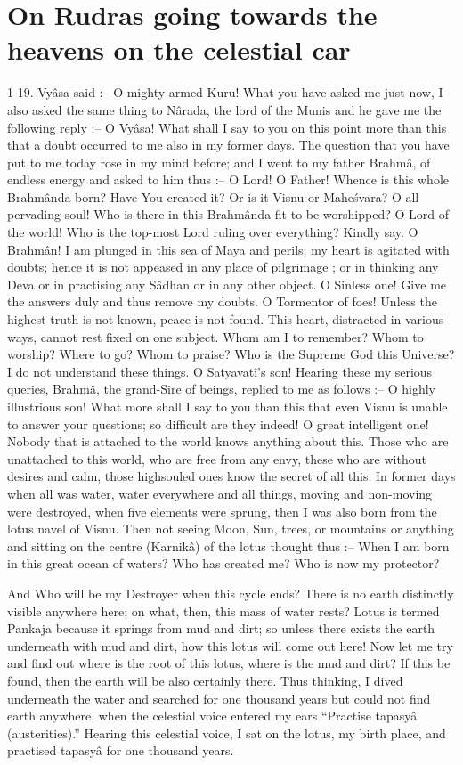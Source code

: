 ﻿\chapter{On Rudras going towards the heavens on the celestial car}

1-19. Vy\^asa said :-- O mighty armed Kuru! What you have asked me just now, I also asked the same thing to N\^arada, the lord of the Munis and he gave me the following reply :-- O Vy\^asa! What shall I say to you on this point more than this that a doubt occurred to me also in my former days. The question that you have put to me today rose in my mind before; and I went to my father Brahm\^a, of endless energy and asked to him thus :-- O Lord! O Father! Whence is this whole Brahm\^anda born? Have You created it? Or is it Visnu or Mahe\'svara? O all pervading soul! Who is there in this Brahm\^anda fit to be worshipped? O Lord of the world! Who is the top-most Lord ruling over everything? Kindly say. O Brahm\^an! I am plunged in this sea of Maya and perils; my heart is agitated with doubts; hence it is not appeased in any place of pilgrimage ; or in thinking any Deva or in practising any S\^adhan or in any other object. O Sinless one! Give me the answers duly and thus remove my doubts. O Tormentor of foes! Unless the highest truth is not known, peace is not found. This heart, distracted in various ways, cannot rest fixed on one subject. Whom am I to remember? Whom to worship? Where to go? Whom to praise? Who is the Supreme God this Universe? I do not understand these things. O Satyavat\^i's son! Hearing these my serious queries, Brahm\^a, the grand-Sire of beings, replied to me as follows :-- O highly illustrious son! What more shall I say to you than this that even Visnu is unable to answer your questions; so difficult are they indeed! O great intelligent one! Nobody that is attached to the world knows anything about this. Those who are unattached to this world, who are free from any envy, these who are without desires and calm, those highsouled ones know the secret of all this. In former days when all was water, water everywhere and all things, moving and non-moving were destroyed, when five elements were sprung, then I was also born from the lotus navel of Visnu. Then not seeing Moon, Sun, trees, or mountains or anything and sitting on the centre (Karnik\^a) of the lotus thought thus :-- When I am born in this great ocean of waters? Who has created me? Who is now my protector?

And Who will be my Destroyer when this cycle ends? There is no earth distinctly visible anywhere here; on what, then, this mass of water rests? Lotus is termed Pankaja because it springs from mud and dirt; so unless there exists the earth underneath with mud and dirt, how this lotus will come out here! Now let me try and find out where is the root of this lotus, where is the mud and dirt? If this be found, then the earth will be also certainly there. Thus thinking, I dived underneath the water and searched for one thousand years but could not find earth anywhere, when the celestial voice entered my ears ``Practise tapasy\^a (austerities).'' Hearing this celestial voice, I sat on the lotus, my birth place, and practised tapasy\^a for one thousand years.

